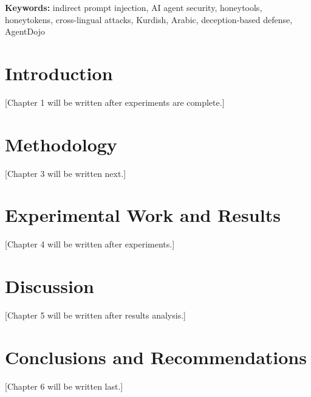 \documentclass[12pt,a4paper,oneside]{report}
\begin{document}
\textbf{Keywords:} indirect prompt injection, AI agent security, honeytools, honeytokens, cross-lingual attacks, Kurdish, Arabic, deception-based defense, AgentDojo

\clearpage
\tableofcontents

\clearpage
\listoftables
\clearpage
\listoffigures

\clearpage
{}
\setcounter{page}{1}

\chapter{Introduction}
\label{ch:introduction}
[Chapter 1 will be written after experiments are complete.]



\chapter{Methodology}
\label{ch:methodology}
[Chapter 3 will be written next.]

\chapter{Experimental Work and Results}
\label{ch:results}
[Chapter 4 will be written after experiments.]

\chapter{Discussion}
\label{ch:discussion}
[Chapter 5 will be written after results analysis.]

\chapter{Conclusions and Recommendations}
\label{ch:conclusions}
[Chapter 6 will be written last.]

\clearpage
\printbibliography[heading=bibintoc, title={References}]
\end{document}
